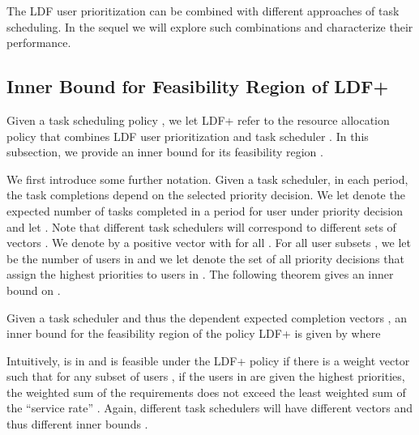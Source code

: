 \documentclass[prodmode,acmtompecs]{acmsmall}
\newcommand{\taskScheduler}{\mathcal{X}}
\newcommand{\myComments}[1]{}
\newif\ifinfocom
\newif\iftompecs
\newcommand{\infocomStart}{\ifinfocom \myComments{Infocom: }}
\newcommand{\tompecsStart}{\iftompecs \myComments{TOMPECS version: }}
\newcommand{\commentEnd}{\myComments{End}}
\begin{document}
The LDF user prioritization can be combined with different approaches of task scheduling. In the sequel we will explore such combinations and characterize their performance. 

\subsection{Inner Bound for Feasibility Region of LDF+}
\label{subsection_LDF}
Given a task scheduling policy , we let LDF+ refer to the resource allocation policy that combines LDF user prioritization and task scheduler .
In this subsection, we provide an inner bound for its feasibility region .   

We first introduce some further notation. 
Given a task scheduler, in each period, the task completions depend on the selected priority decision. We let  denote the expected number of tasks completed in a period for user  under priority decision  and let . Note that different task schedulers will correspond to different sets of vectors . 
We denote by  a positive vector  with  for all . For all user subsets , we let  be the number of users in  and we let  denote the set of all priority decisions that assign the highest  priorities to users in . 
The following theorem gives an inner bound on \taskScheduler. 
\begin{theorem}
\label{thm_R_IB}
Given a task scheduler  and thus the  dependent expected completion vectors , an inner bound for the feasibility region of the \tompecsStart resource allocation \commentEnd\fi policy LDF+ is given by
\taskScheduler 
where 

\end{theorem}

Intuitively,  is in  and is feasible under the LDF+ policy if there is a weight vector  such that for any subset of users , if the users in  are given the highest priorities, the weighted sum of the requirements  does not exceed the least weighted sum of the ``service rate'' . Again, different task schedulers  will have different vectors  and thus different inner bounds . 
\infocomStart
For a detailed proof, see the extended version of this paper \cite{EXT}. 
\commentEnd\fi
\tompecsStart
A proof is provided in Appendix \ref{pf_theorem_R_IB}. 
Note that Theorem \ref{thm_R_IB} applies beyond the SRT-MIC model when the LDF policy is used but in a general setting where  represent the expected payoffs under priority decision  and users require long-term time-averaged payoff  per period. The LDF policy can also be generalized to a class of weighted LDF policies. This general result is further developed in \cite{DuD16E}. 
\commentEnd\fi
\end{document}
